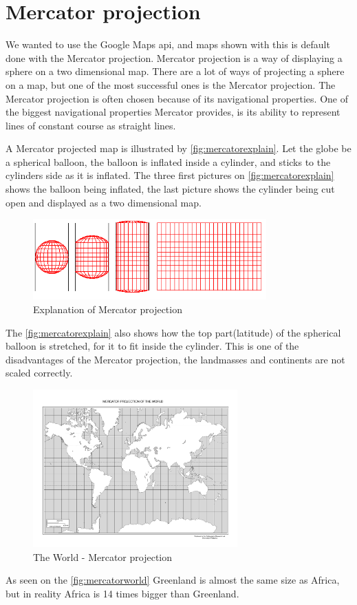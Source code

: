 \section{Mercator projection}\label{sec:mercatorprojection}
We wanted to use the Google Maps \ac{api}, and maps shown with this is default done with the Mercator projection. Mercator projection is a way of displaying a sphere on a two dimensional map. There are a lot of ways of projecting a sphere on a map, but one of the most successful ones is the Mercator projection. The Mercator projection is often chosen because of its navigational properties. One of the biggest navigational properties Mercator provides, is its ability to represent lines of constant course as straight lines.

A Mercator projected map is illustrated by \autoref{fig:mercatorexplain}. Let the globe be a spherical balloon, the balloon is inflated inside a cylinder, and sticks to the cylinders side as it is inflated. The three first pictures on \autoref{fig:mercatorexplain} shows the balloon being inflated, the last picture shows the cylinder being cut open and displayed as a two dimensional map.
\begin{figure}[H]
\centering
\includegraphics[width=0.8\textwidth]{img/mercatorexplain.png}
\caption{Explanation of Mercator projection \citep{mercatorexplain}}
\label{fig:mercatorexplain}
\end{figure}
The \autoref{fig:mercatorexplain} also shows how the top part(latitude) of the spherical balloon is stretched, for it to fit inside the cylinder. This is one of the disadvantages of the Mercator projection, the landmasses and continents are not scaled correctly.
\begin{figure}[H]
\centering
\includegraphics[width=0.7\textwidth]{img/mercatorworld.pdf}
\caption{The World - Mercator projection  \citep{mercatorworld}}
\label{fig:mercatorworld}
\end{figure} As seen on the \autoref{fig:mercatorworld} Greenland is almost the same size as Africa, but in reality Africa is 14 times bigger than Greenland.

